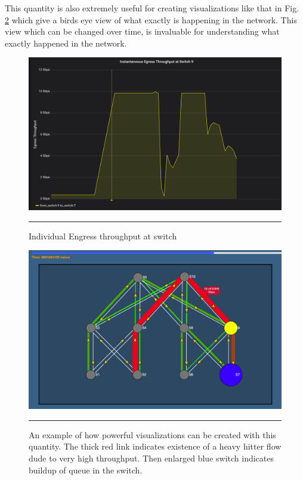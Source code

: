 This quantity is also extremely useful for creating visualizations like that in Fig. \ref{fig:Eg_example} which give a birds eye view of what exactly is happening in the network. This view
which can be changed over time, is invaluable for understanding what exactly happened in the network.

\begin{figure}[htbp]
	\centering
		\includegraphics[width=1.0\columnwidth]{Figures/egress_individual.png}
		\rule{35em}{0.5pt}
	\caption[Individual Egress Throughputs]{Individual Engress throughput at switch}
	\label{fig:Eg_Ind}
\end{figure}

\begin{figure}[htbp]
	\centering
		\includegraphics[width=1.0\columnwidth]{Figures/egress_example.png}
		\rule{35em}{0.5pt}
	\caption[Link Throughputs Visualizations]{An example of how powerful visualizations can be created with this quantity. The thick red link indicates existence of a heavy hitter flow dude to very high throughput. Then enlarged blue switch indicates buildup of queue in the switch.}
	\label{fig:Eg_example}
\end{figure}